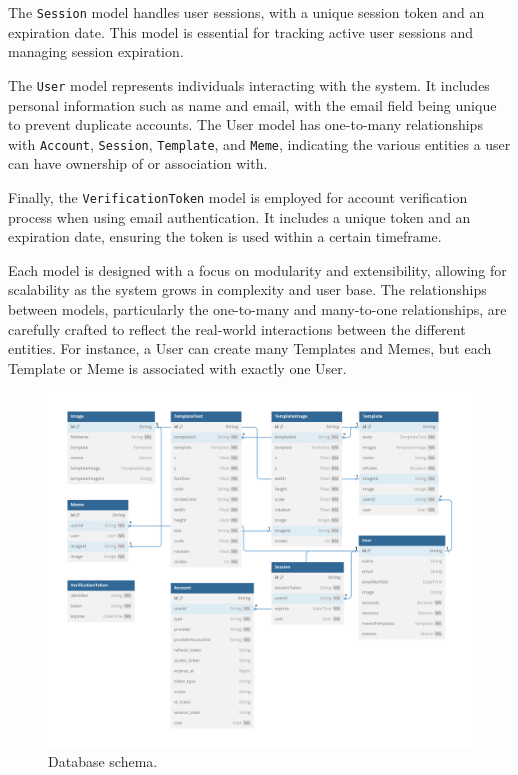 The \texttt{Session} model handles user sessions, with a unique session token and an expiration date. This model is essential for tracking active user sessions and managing session expiration.

The \texttt{User} model represents individuals interacting with the system. It includes personal information such as name and email, with the email field being unique to prevent duplicate accounts. The User model has one-to-many relationships with \texttt{Account}, \texttt{Session}, \texttt{Template}, and \texttt{Meme}, indicating the various entities a user can have ownership of or association with.

Finally, the \texttt{VerificationToken} model is employed for account verification process when using email authentication. It includes a unique token and an expiration date, ensuring the token is used within a certain timeframe.

Each model is designed with a focus on modularity and extensibility, allowing for scalability as the system grows in complexity and user base. The relationships between models, particularly the one-to-many and many-to-one relationships, are carefully crafted to reflect the real-world interactions between the different entities. For instance, a User can create many Templates and Memes, but each Template or Meme is associated with exactly one User.

\begin{figure}
    \centering
    \includegraphics[width=\textwidth]{text/diagram/database-schema.png}
    \caption{Database schema.}
    \label{fig:database}
\end{figure}


